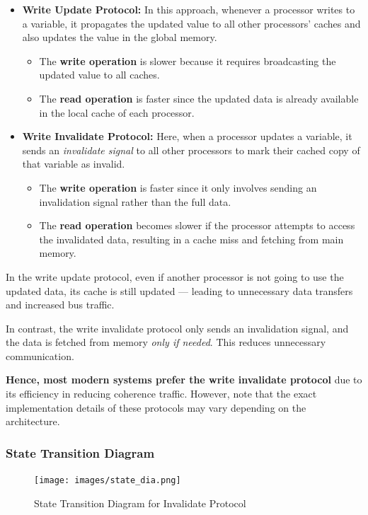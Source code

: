 \documentclass[12pt]{book}
\begin{document}
\begin{itemize}
    \item \textbf{Write Update Protocol:}  
    In this approach, whenever a processor writes to a variable, it propagates the updated value to all other processors' caches and also updates the value in the global memory.  
    \begin{itemize}
        \item The \textbf{write operation} is slower because it requires broadcasting the updated value to all caches.
        \item The \textbf{read operation} is faster since the updated data is already available in the local cache of each processor.
    \end{itemize}

    \item \textbf{Write Invalidate Protocol:}  
    Here, when a processor updates a variable, it sends an \emph{invalidate signal} to all other processors to mark their cached copy of that variable as invalid.  
    \begin{itemize}
        \item The \textbf{write operation} is faster since it only involves sending an invalidation signal rather than the full data.
        \item The \textbf{read operation} becomes slower if the processor attempts to access the invalidated data, resulting in a cache miss and fetching from main memory.
    \end{itemize}
\end{itemize}

\begin{tcolorbox}[colback=gray!10!white, colframe=black, title=Note]
In the write update protocol, even if another processor is not going to use the updated data, its cache is still updated — leading to unnecessary data transfers and increased bus traffic.

In contrast, the write invalidate protocol only sends an invalidation signal, and the data is fetched from memory \emph{only if needed}. This reduces unnecessary communication.

\textbf{Hence, most modern systems prefer the write invalidate protocol} due to its efficiency in reducing coherence traffic. However, note that the exact implementation details of these protocols may vary depending on the architecture.
\end{tcolorbox}


\subsubsection{State Transition Diagram}
\begin{figure}[H]
    \centering
    \texttt{[image: images/state\_dia.png]}
    \caption{State Transition Diagram for Invalidate Protocol}
    \label{fig:state_transition}
\end{figure}
\end{document}
